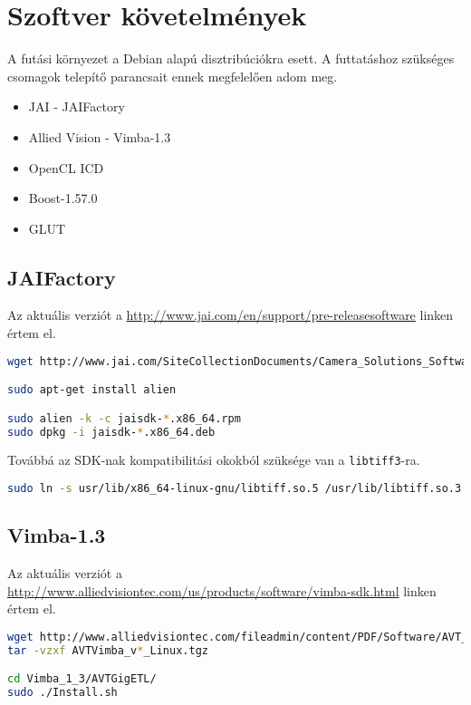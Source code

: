 \section{Szoftver követelmények}
A futási környezet a Debian alapú disztribúciókra esett. A futtatáshoz szükséges csomagok telepítő parancsait ennek megfelelően
adom meg.
\begin{itemize}[noitemsep]
	\item JAI - JAIFactory
	\item Allied Vision - Vimba-1.3
	\item OpenCL ICD
	\item Boost-1.57.0
	\item GLUT
\end{itemize}

\subsection*{JAIFactory}
	Az aktuális verziót a \url{http://www.jai.com/en/support/pre-releasesoftware} linken értem el.

\begin{lstlisting}[language=bash]
wget http://www.jai.com/SiteCollectionDocuments/Camera_Solutions_Software/jaisdk-1.00-rc22.x86_64.rpm

sudo apt-get install alien

sudo alien -k -c jaisdk-*.x86_64.rpm
sudo dpkg -i jaisdk-*.x86_64.deb
\end{lstlisting}

	Továbbá az SDK-nak kompatibilitási okokból szüksége van a \texttt{libtiff3}-ra.
\begin{lstlisting}[language=bash]
sudo ln -s usr/lib/x86_64-linux-gnu/libtiff.so.5 /usr/lib/libtiff.so.3
\end{lstlisting}

\subsection*{Vimba-1.3}
	Az aktuális verziót a \url{http://www.alliedvisiontec.com/us/products/software/vimba-sdk.html} linken értem el.

\begin{lstlisting}[language=bash]
wget http://www.alliedvisiontec.com/fileadmin/content/PDF/Software/AVT_software/zip_files/VIMBA/AVTVimba_v1.3_Linux.tgz
tar -vzxf AVTVimba_v*_Linux.tgz

cd Vimba_1_3/AVTGigETL/
sudo ./Install.sh
\end{lstlisting}


